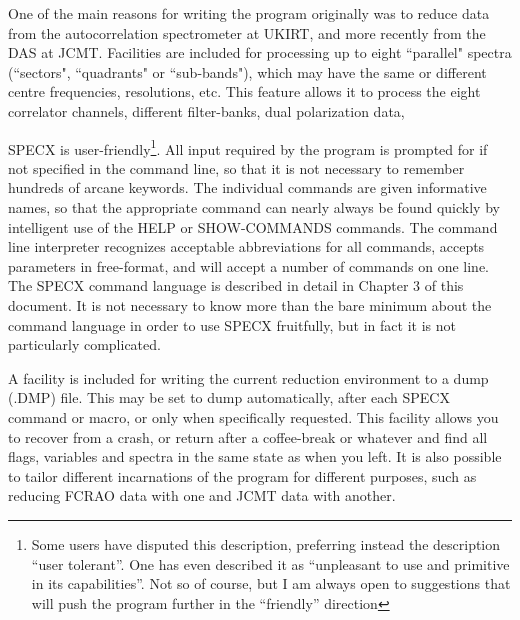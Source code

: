 \documentclass[11pt,twoside]{report}
\begin{document}
One of the main reasons for writing the program originally was to
reduce data from the autocorrelation spectrometer at
UKIRT, and more recently from the DAS at JCMT. Facilities are included
for processing up to eight ``parallel" spectra
(``sectors", ``quadrants" or
``sub-bands"), which may have the same or different
centre frequencies, resolutions, etc. This feature allows it to
process the eight correlator channels, different
filter-banks, dual polarization  data, \etc

SPECX is user-friendly\footnote{Some users have disputed this
description, preferring instead the description ``user tolerant''. One
has even described it as ``unpleasant to use and primitive in its
capabilities''. Not so of course, but I am always open to suggestions
that will push the program further in the ``friendly'' direction}. All
input required by the program is prompted for if not specified in the
command line, so that it is not necessary to remember hundreds of
arcane keywords. The individual commands are given informative names,
so that the appropriate command can nearly always be found quickly by
intelligent use of the HELP or SHOW-COMMANDS commands. The command
line interpreter recognizes acceptable abbreviations for all commands,
accepts parameters in free-format, and will accept a number of
commands on one line. The SPECX command language is described in
detail in Chapter 3 of this document. It is not necessary to know more
than the bare minimum about the command language in order to use SPECX
fruitfully, but in fact it is not particularly complicated.

A facility is included for writing the current reduction
environment to a dump (.DMP) file. This may be set
to dump automatically, after each SPECX command or macro, or only when
specifically requested. This facility allows you to recover from a
crash, or return after a coffee-break or whatever
and find all flags, variables and spectra in the same state as when
you left. It is also possible to tailor different incarnations of the
program for different purposes, such as reducing FCRAO data with one
and JCMT data with another.
\end{document}

